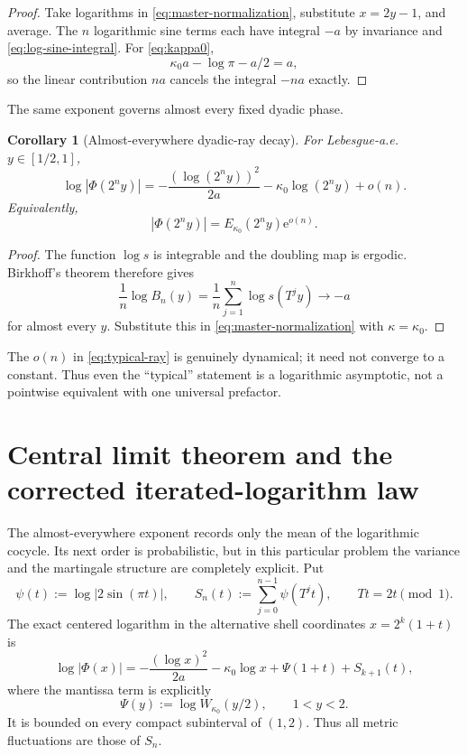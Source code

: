 \documentclass[11pt,oneside]{article}
\newtheorem{corollary}[corollary]{Corollary}
\theoremstyle{definition}
\theoremstyle{remark}
\newcommand{\e}{\mathrm e}
\newcommand{\Phiup}{\Phi}
\newcommand{\abs}[1]{\left|#1\right|}
\begin{document}
\begin{proof}
Take logarithms in \eqref{eq:master-normalization}, substitute $x=2y-1$, and average.
The $n$ logarithmic sine terms each have integral $-a$ by invariance and
\eqref{eq:log-sine-integral}.  For \eqref{eq:kappa0},
\[
 \kappa_0a-\log\pi-a/2=a,
\]
so the linear contribution $na$ cancels the integral $-na$ exactly.
\end{proof}

The same exponent governs almost every fixed dyadic phase.

\begin{corollary}[Almost-everywhere dyadic-ray decay]
\label{cor:typical-ray}
For Lebesgue-a.e. $y\in[1/2,1]$,
\begin{equation}
 \log\abs{\Phiup(2^ny)}
 =-\frac{(\log(2^ny))^2}{2a}
  -\kappa_0\log(2^ny)+o(n).
 \label{eq:typical-ray}
\end{equation}
Equivalently,
\[
 \abs{\Phiup(2^ny)}=E_{\kappa_0}(2^ny)\e^{o(n)}.
\]
\end{corollary}

\begin{proof}
The function $\log s$ is integrable and the doubling map is ergodic.  Birkhoff's theorem
therefore gives
\[
 \frac1n\log B_n(y)=\frac1n\sum_{j=1}^{n}\log s(T^jy)\longrightarrow-a
\]
for almost every $y$.  Substitute this in \eqref{eq:master-normalization} with
$\kappa=\kappa_0$.
\end{proof}

The $o(n)$ in \eqref{eq:typical-ray} is genuinely dynamical; it need not converge to a
constant.  Thus even the ``typical'' statement is a logarithmic asymptotic, not a pointwise
equivalent with one universal prefactor.


\section{Central limit theorem and the corrected iterated-logarithm law}
\label{sec:fluctuations}

The almost-everywhere exponent records only the mean of the logarithmic cocycle.  Its next
order is probabilistic, but in this particular problem the variance and the martingale
structure are completely explicit.  Put
\begin{equation}
 \psi(t):=\log|2\sin(\pi t)|,
 \qquad
 S_n(t):=\sum_{j=0}^{n-1}\psi(T^jt),
 \qquad Tt=2t\pmod1.
 \label{eq:psi-Sn}
\end{equation}
The exact centered logarithm in the alternative shell coordinates $x=2^k(1+t)$ is
\begin{equation}
 \log|\Phi(x)|
 =-\frac{(\log x)^2}{2a}-\kappa_0\log x+\Psi(1+t)+S_{k+1}(t),
 \label{eq:centered-log-final}
\end{equation}
where the mantissa term is explicitly
\begin{equation}
 \Psi(y):=\log W_{\kappa_0}(y/2),\qquad 1<y<2.
 \label{eq:Psi-mantissa}
\end{equation}
It is bounded on every compact subinterval of $(1,2)$.  Thus all metric fluctuations are
those of $S_n$.
\end{document}
